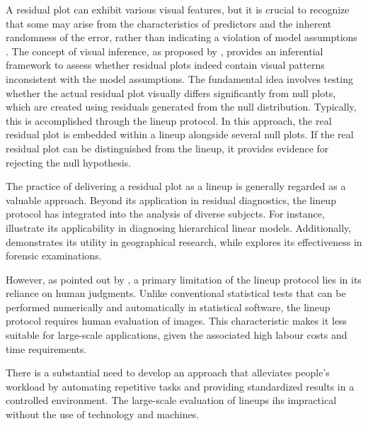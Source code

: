 \documentclass[]{interact}
\theoremstyle{plain}%
\theoremstyle{definition}
\theoremstyle{remark}
\begin{document}
A residual plot can exhibit various visual features, but it is crucial
to recognize that some may arise from the characteristics of predictors
and the inherent randomness of the error, rather than indicating a
violation of model assumptions \citep{li2023plot}. The concept of visual
inference, as proposed by \citet{buja2009statistical}, provides an
inferential framework to assess whether residual plots indeed contain
visual patterns inconsistent with the model assumptions. The fundamental
idea involves testing whether the actual residual plot visually differs
significantly from null plots, which are created using residuals
generated from the null distribution. Typically, this is accomplished
through the lineup protocol. In this approach, the real residual plot is
embedded within a lineup alongside several null plots. If the real
residual plot can be distinguished from the lineup, it provides evidence
for rejecting the null hypothesis.

The practice of delivering a residual plot as a lineup is generally
regarded as a valuable approach. Beyond its application in residual
diagnostics, the lineup protocol has integrated into the analysis of
diverse subjects. For instance,
\cite{loy2013diagnostic, loy2014hlmdiag, loy2015you} illustrate its
applicability in diagnosing hierarchical linear models. Additionally,
\citet{widen2016graphical} demonstrates its utility in geographical
research, while \citet{krishnan2021hierarchical} explores its
effectiveness in forensic examinations.

However, as pointed out by \citet{li2023plot}, a primary limitation of
the lineup protocol lies in its reliance on human judgments. Unlike
conventional statistical tests that can be performed numerically and
automatically in statistical software, the lineup protocol requires
human evaluation of images. This characteristic makes it less suitable
for large-scale applications, given the associated high labour costs and
time requirements.

There is a substantial need to develop an approach that alleviates
people's workload by automating repetitive tasks and providing
standardized results in a controlled environment. The large-scale
evaluation of lineups ihs impractical without the use of technology and
machines.
\end{document}
